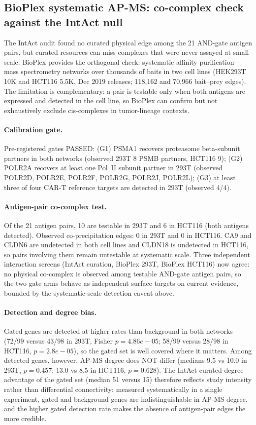 \subsection{BioPlex systematic AP-MS: co-complex check against the IntAct null}
\label{sec:bioplex}
The IntAct audit found no curated physical edge among the 21 AND-gate antigen
pairs, but curated resources can miss complexes that were never assayed at
small scale. BioPlex provides the orthogonal check: systematic affinity
purification--mass spectrometry networks over thousands of baits in two cell
lines (HEK293T 10K and HCT116 5.5K, Dec 2019 releases; 118,162 and
70,966 bait--prey edges). The limitation is complementary: a pair is
testable only when both antigens are expressed and detected in the cell line,
so BioPlex can confirm but not exhaustively exclude cis-complexes in
tumor-lineage contexts.

\paragraph{Calibration gate.} Pre-registered gates PASSED: (G1) PSMA1
recovers proteasome beta-subunit partners in both networks (observed
293T 8 PSMB partners, HCT116 9); (G2) POLR2A recovers at least one Pol~II subunit partner in
293T (observed POLR2D, POLR2E, POLR2F, POLR2G, POLR2J, POLR2L); (G3) at least three of four CAR-T reference
targets are detected in 293T (observed 4/4).

\paragraph{Antigen-pair co-complex test.} Of the 21 antigen pairs,
10 are testable in 293T and 6 in HCT116 (both antigens
detected). Observed co-precipitation edges: 0 in 293T and
0 in HCT116. CA9 and CLDN6 are undetected in both cell lines and
CLDN18 is undetected in HCT116, so pairs involving them remain untestable at
systematic scale. Three independent interaction screens (IntAct curation, BioPlex 293T, BioPlex HCT116) now agree: no physical co-complex is observed among testable AND-gate antigen pairs, so the two gate arms behave as independent surface targets on current evidence, bounded by the systematic-scale detection caveat above.

\paragraph{Detection and degree bias.} Gated genes are detected at higher
rates than background in both networks (72/99 versus 43/98 in 293T,
Fisher $p=4.86e-05$; 58/99 versus 28/98 in HCT116, $p=2.8e-05$),
so the gated set is well covered where it matters. Among detected genes,
however, AP-MS degree does NOT differ (medians 9.5 vs 10.0 in 293T,
$p=0.457$; 13.0 vs 8.5 in HCT116, $p=0.628$). The IntAct curated-degree advantage of the gated set (median 51 versus 15) therefore reflects study intensity rather than differential connectivity: measured systematically in a single experiment, gated and background genes are indistinguishable in AP-MS degree, and the higher gated detection rate makes the absence of antigen-pair edges the more credible.

